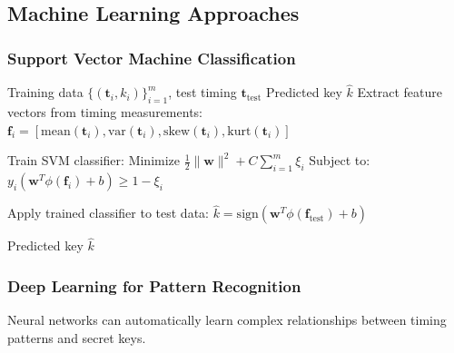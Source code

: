 \documentclass[11pt,a4paper]{article}
\theoremstyle{definition}
\begin{document}
\subsection{Machine Learning Approaches}

\subsubsection{Support Vector Machine Classification}

\begin{algorithm}
\caption{SVM-Based Branch Pattern Classification}
\begin{algorithmic}[1]
\REQUIRE Training data $\{(\mathbf{t}_i, k_i)\}_{i=1}^m$, test timing $\mathbf{t}_{\text{test}}$
\ENSURE Predicted key $\hat{k}$
\STATE Extract feature vectors from timing measurements:
\STATE $\mathbf{f}_i = [\text{mean}(\mathbf{t}_i), \text{var}(\mathbf{t}_i), \text{skew}(\mathbf{t}_i), \text{kurt}(\mathbf{t}_i)]$

\STATE Train SVM classifier:
\STATE Minimize $\frac{1}{2}\|\mathbf{w}\|^2 + C\sum_{i=1}^m \xi_i$
\STATE Subject to: $y_i(\mathbf{w}^T\phi(\mathbf{f}_i) + b) \geq 1 - \xi_i$

\STATE Apply trained classifier to test data:
\STATE $\hat{k} = \text{sign}(\mathbf{w}^T\phi(\mathbf{f}_{\text{test}}) + b)$

\RETURN Predicted key $\hat{k}$
\end{algorithmic}
\end{algorithm}

\subsubsection{Deep Learning for Pattern Recognition}

Neural networks can automatically learn complex relationships between timing patterns and secret keys.
\end{document}
